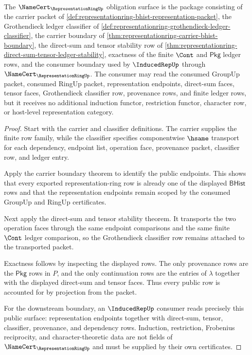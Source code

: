 \begin{theorem}
\label{thm:representationring-namecert-obligation-surface}
The $\NameCert_{\RepresentationRingUp}$ obligation surface is the package
consisting of the carrier packet of
\autoref{def:representationring-bhist-representation-packet}, the
Grothendieck ledger classifier of
\autoref{def:representationring-grothendieck-ledger-classifier}, the carrier
boundary of \autoref{thm:representationring-carrier-bhist-boundary}, the
direct-sum and tensor stability row of
\autoref{thm:representationring-direct-sum-tensor-ledger-stability}, exactness
of the finite $\Cont$ and $\mathsf{Pkg}$ ledger rows, and the consumer
boundary used by $\InducedRepUp$ through $\NameCert_{\RepresentationRingUp}$.
The consumer may read the consumed GroupUp packet, consumed RingUp packet,
representation endpoints, direct-sum faces, tensor faces, Grothendieck
classifier row, provenance rows, and finite ledger rows, but it receives no
additional induction functor, restriction functor, character row, or
host-level representation category.
\end{theorem}
\begin{proof}
Start with the carrier and classifier definitions. The carrier supplies the
finite row family, while the classifier specifies componentwise $\hsame$
transport for each dependency, endpoint list, operation face, provenance
packet, classifier row, and ledger entry.

Apply the carrier boundary theorem to identify the public endpoints. This
shows that every exported representation-ring row is already one of the
displayed $\mathsf{BHist}$ rows and that the representation endpoints remain
scoped by the consumed GroupUp and RingUp certificates.

Next apply the direct-sum and tensor stability theorem. It transports the two
operation faces through the same endpoint comparisons and the same finite
$\Cont$ ledger comparison, so the Grothendieck classifier row remains attached
to the transported packet.

Exactness follows by inspecting the displayed rows. The only provenance rows
are the $\mathsf{Pkg}$ rows in $P$, and the only continuation rows are the
entries of $\lambda$ together with the displayed direct-sum and tensor faces.
Thus every public row is accounted for by projection from the packet.

For the downstream boundary, an $\InducedRepUp$ consumer reads precisely this
public surface: representation endpoints together with direct-sum, tensor,
classifier, provenance, and dependency rows. Induction, restriction,
Frobenius reciprocity, and character-theoretic data are not fields of
$\NameCert_{\RepresentationRingUp}$ and must be supplied by their own
certificates.
\end{proof}

